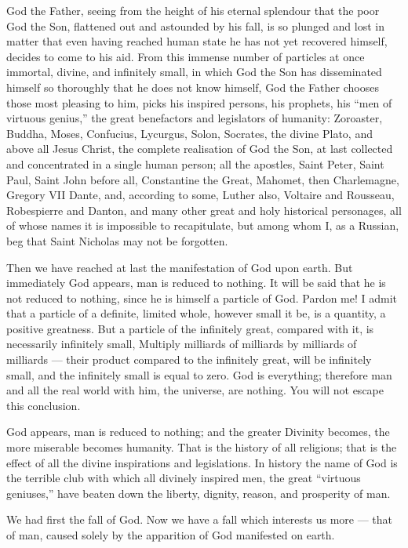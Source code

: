\documentclass[12pt]{report}
\begin{document}
God the Father, seeing from the height of his eternal splendour that the poor God the Son, flattened out and astounded by his fall, is so plunged and lost in matter that even having reached human state he has not yet recovered himself, decides to come to his aid. From this immense number of particles at once immortal, divine, and infinitely small, in which God the Son has disseminated himself so thoroughly that he does not know himself, God the Father chooses those most pleasing to him, picks his inspired persons, his prophets, his “men of virtuous genius,” the great benefactors and legislators of humanity: Zoroaster, Buddha, Moses, Confucius, Lycurgus, Solon, Socrates, the divine Plato, and above all Jesus Christ, the complete realisation of God the Son, at last collected and concentrated in a single human person; all the apostles, Saint Peter, Saint Paul, Saint John before all, Constantine the Great, Mahomet, then Charlemagne, Gregory VII Dante, and, according to some, Luther also, Voltaire and Rousseau, Robespierre and Danton, and many other great and holy historical personages, all of whose names it is impossible to recapitulate, but among whom I, as a Russian, beg that Saint Nicholas may not be forgotten.


Then we have reached at last the manifestation of God upon earth. But immediately God appears, man is reduced to nothing. It will be said that he is not reduced to nothing, since he is himself a particle of God. Pardon me! I admit that a particle of a definite, limited whole, however small it be, is a quantity, a positive greatness. But a particle of the infinitely great, compared with it, is necessarily infinitely small, Multiply milliards of milliards by milliards of milliards — their product compared to the infinitely great, will be infinitely small, and the infinitely small is equal to zero. God is everything; therefore man and all the real world with him, the universe, are nothing. You will not escape this conclusion.


God appears, man is reduced to nothing; and the greater Divinity becomes, the more miserable becomes humanity. That is the history of all religions; that is the effect of all the divine inspirations and legislations. In history the name of God is the terrible club with which all divinely inspired men, the great “virtuous geniuses,” have beaten down the liberty, dignity, reason, and prosperity of man.


We had first the fall of God. Now we have a fall which interests us more — that of man, caused solely by the apparition of God manifested on earth.
\end{document}
